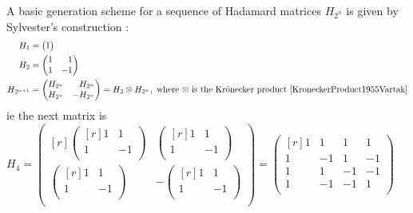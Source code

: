 \documentclass[a4paper,11pt]{article}
\begin{document}
    A basic generation scheme for a sequence of Hadamard matrices $H_{2^n}$ is
    given by Sylvester's construction \cite{OrthogonalMatrix1867Sylvester}:
    \begin{align*}
    H_1 &=
    \begin{pmatrix*}[r]
    1\\
    \end{pmatrix*} \\
    H_2 &=
    \begin{pmatrix*}[r]
    1 &  1 \\
    1 & -1 \\
    \end{pmatrix*} \\
    H_{2^{n + 1}} &=
    \begin{pmatrix*}[r]
    H_{2^n} &  H_{2^n} \\
    H_{2^n} & -H_{2^n} \\
    \end{pmatrix*} =
    H_2 \otimes H_{2^n},\ \text{where $\otimes$ is the Kr\"onecker product
    \cite{KroneckerProduct1955Vartak}}
    \end{align*}
    ie the next matrix is
    \begin{math}
    H_4 =
    \begin{pmatrix*}[r]
    \begin{pmatrix*}[r]
    1 &  1 \\
    1 & -1 \\
    \end{pmatrix*} &
    \begin{pmatrix*}[r]
    1 &  1 \\
    1 & -1 \\
    \end{pmatrix*} \\
    \begin{pmatrix*}[r]
    1 &  1 \\
    1 & -1 \\
    \end{pmatrix*} &
    -\begin{pmatrix*}[r]
    1 &  1 \\
    1 & -1 \\
    \end{pmatrix*} \\
    \end{pmatrix*} =
    \begin{pmatrix*}[r]
    1 &  1 &  1 &  1 \\
    1 & - 1 &  1 & - 1 \\
    1 &  1 & - 1 & - 1 \\
    1 & - 1 & - 1 &  1 \\
    \end{pmatrix*}
    \end{math}
\end{document}

